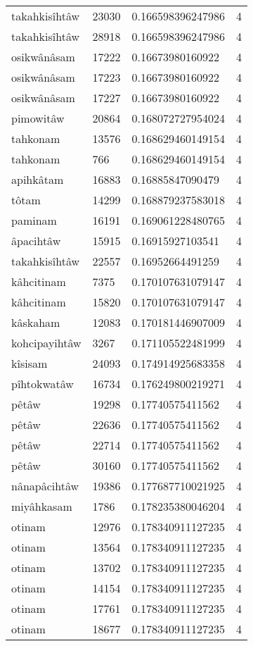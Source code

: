 \begin{longtable}{llll}
takahkisîhtâw & 23030 & 0.166598396247986 & 4 \\
takahkisîhtâw & 28918 & 0.166598396247986 & 4 \\
osikwânâsam & 17222 & 0.16673980160922 & 4 \\
osikwânâsam & 17223 & 0.16673980160922 & 4 \\
osikwânâsam & 17227 & 0.16673980160922 & 4 \\
pimowitâw & 20864 & 0.168072727954024 & 4 \\
tahkonam & 13576 & 0.168629460149154 & 4 \\
tahkonam & 766 & 0.168629460149154 & 4 \\
apihkâtam & 16883 & 0.16885847090479 & 4 \\
tôtam & 14299 & 0.168879237583018 & 4 \\
paminam & 16191 & 0.169061228480765 & 4 \\
âpacihtâw & 15915 & 0.16915927103541 & 4 \\
takahkisîhtâw & 22557 & 0.16952664491259 & 4 \\
kâhcitinam & 7375 & 0.170107631079147 & 4 \\
kâhcitinam & 15820 & 0.170107631079147 & 4 \\
kâskaham & 12083 & 0.170181446907009 & 4 \\
kohcipayihtâw & 3267 & 0.171105522481999 & 4 \\
kîsisam & 24093 & 0.174914925683358 & 4 \\
pîhtokwatâw & 16734 & 0.176249800219271 & 4 \\
pêtâw & 19298 & 0.17740575411562 & 4 \\
pêtâw & 22636 & 0.17740575411562 & 4 \\
pêtâw & 22714 & 0.17740575411562 & 4 \\
pêtâw & 30160 & 0.17740575411562 & 4 \\
nânapâcihtâw & 19386 & 0.177687710021925 & 4 \\
miyâhkasam & 1786 & 0.178235380046204 & 4 \\
otinam & 12976 & 0.178340911127235 & 4 \\
otinam & 13564 & 0.178340911127235 & 4 \\
otinam & 13702 & 0.178340911127235 & 4 \\
otinam & 14154 & 0.178340911127235 & 4 \\
otinam & 17761 & 0.178340911127235 & 4 \\
otinam & 18677 & 0.178340911127235 & 4 \\

\end{longtable}
